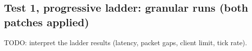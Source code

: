 \documentclass[11pt]{article}
\begin{document}
\subsection{Test 1, progressive ladder: granular runs (both patches applied)}
\label{sec:ladder}
TODO: interpret the ladder results (latency, packet gaps, client limit, tick rate).
\end{document}
